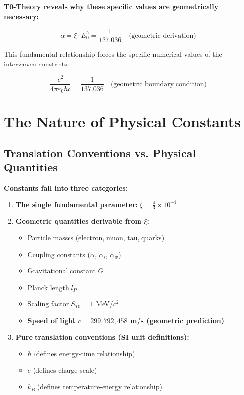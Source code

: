 \documentclass[12pt,a4paper]{article}
\begin{document}
	\begin{insight}
		\textbf{T0-Theory reveals why these specific values are geometrically necessary:}
		
		\begin{equation}
			\alpha = \xi \cdot E_0^2 = \frac{1}{137.036} \quad \text{(geometric derivation)}
		\end{equation}
		
		This fundamental relationship forces the specific numerical values of the interwoven constants:
		
		\begin{equation}
			\frac{e^2}{4\pi\varepsilon_0\hbar c} = \frac{1}{137.036} \quad \text{(geometric boundary condition)}
		\end{equation}
	\end{insight}
	
	\section{The Nature of Physical Constants}
	
	\subsection{Translation Conventions vs. Physical Quantities}
	
	\begin{keyresult}
		\textbf{Constants fall into three categories:}
		\begin{enumerate}
			\item \textbf{The single fundamental parameter:} $\xi = \frac{4}{3} \times 10^{-4}$
			
			\item \textbf{Geometric quantities derivable from $\xi$:}
			\begin{itemize}
				\item Particle masses (electron, muon, tau, quarks)
				\item Coupling constants ($\alpha$, $\alpha_s$, $\alpha_w$)
				\item Gravitational constant $G$
				\item Planck length $l_P$
				\item Scaling factor $S_{T0} = 1$ MeV/$c^2$
				\item \textbf{Speed of light $c = 299,792,458$ m/s (geometric prediction)}
			\end{itemize}
			
			\item \textbf{Pure translation conventions (SI unit definitions):}
			\begin{itemize}
				\item $\hbar$ (defines energy-time relationship)
				\item $e$ (defines charge scale)
				\item $k_B$ (defines temperature-energy relationship)
			\end{itemize}
		\end{enumerate}
	\end{keyresult}
	
\end{document}
